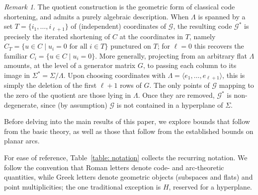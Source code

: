 \documentclass[11pt,a4paper]{amsart}
\newcommand{\G}{\mathcal{G}}
\theoremstyle{plain}
\theoremstyle{definition}
\theoremstyle{remark}
\newtheorem{remark}[theorem]{Remark}
\begin{document}
	\begin{remark}\label{rem: shortening is algebraic}
		The quotient construction is the geometric form of classical code shortening, and admits a purely algebraic description. When $\Lambda$ is spanned by a set $T=\{i_1,\dots,i_{\ell+1}\}$ of (independent) coordinates of $\G$, the resulting code $\G^*$ is precisely the iterated shortening of $C$ at the coordinates in $T$, namely $C_T=\{u\in C\mid u_i=0 \text{ for all } i\in T\}$ punctured on $T$; for $\ell=0$ this recovers the familiar $C_i=\{u\in C\mid u_i=0\}$. More generally, projecting from an arbitrary flat $\Lambda$ amounts, at the level of a generator matrix $G$, to passing each column to its image in $\Sigma^*=\Sigma/\Lambda$. Upon choosing coordinates with $\Lambda=\langle e_1,\dots,e_{\ell+1}\rangle$, this is simply the deletion of the first $\ell+1$ rows of $G$. The only points of $\G$ mapping to the zero of the quotient are those lying in $\Lambda$. Once they are removed, $\G^*$ is non-degenerate, since (by assumption) $\G$ is not contained in a hyperplane of $\Sigma$.
	\end{remark}

	Before delving into the main results of this paper, we explore bounds that follow from the basic theory, as well as those that follow from the established bounds on planar arcs.

For ease of reference, Table~\ref{table: notation} collects the recurring notation. We follow the convention that Roman letters denote code- and arc-theoretic quantities, while Greek letters denote geometric objects (subspaces and flats) and point multiplicities; the one traditional exception is $H$, reserved for a hyperplane.
\end{document}
